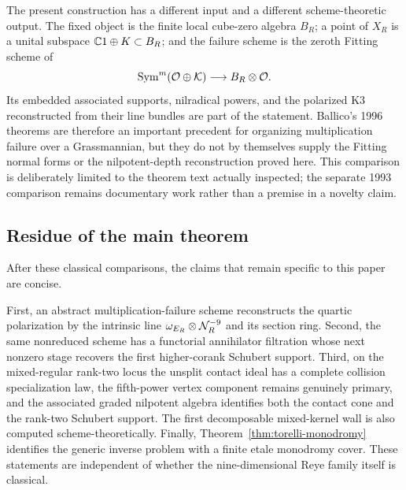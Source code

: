 The present construction has a different input and a different
scheme-theoretic output.  The fixed object is the finite local
cube-zero algebra $B_R$; a point of $X_R$ is a unital subspace
$\mathbb C1\oplus K\subset B_R$; and the failure scheme is the zeroth Fitting
scheme of
\[
 \operatorname{Sym}^m(\mathcal O\oplus\mathcal K)\longrightarrow B_R\otimes\mathcal O.
\]
Its embedded associated supports, nilradical powers, and the
polarized K3 reconstructed from their line bundles are part of the
statement.  Ballico's 1996 theorems are therefore an important
precedent for organizing multiplication failure over a Grassmannian,
but they do not by themselves supply the Fitting normal forms or the
nilpotent-depth reconstruction proved here.  This comparison is
deliberately limited to the theorem text actually inspected; the
separate 1993 comparison remains documentary work rather than a
premise in a novelty claim.

\subsection{Residue of the main theorem}

After these classical comparisons, the claims that remain specific to
this paper are concise.

First, an abstract multiplication-failure scheme reconstructs the
quartic polarization by the intrinsic line
$\omega_{E_R}\otimes\mathcal N_R^{-9}$ and its section ring.  Second, the
same nonreduced scheme has a functorial annihilator filtration whose
next nonzero stage recovers the first higher-corank Schubert support.
Third, on the mixed-regular rank-two locus the unsplit contact ideal
has a complete collision specialization law, the fifth-power vertex
component remains genuinely primary, and the associated graded
nilpotent algebra identifies both the contact cone and the rank-two
Schubert support.  The first decomposable mixed-kernel wall is also
computed scheme-theoretically.  Finally,
Theorem~\ref{thm:torelli-monodromy} identifies the generic inverse
problem with a finite etale monodromy cover.  These statements are
independent of whether the nine-dimensional Reye family itself is
classical.
